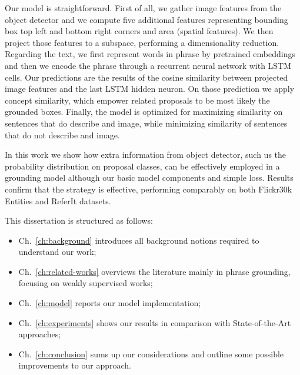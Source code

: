 Our model is straightforward. First of all, we gather image features
from the object detector and we compute five additional features
representing bounding box top left and bottom right corners and area
(spatial features). We then project those features to a subspace,
performing a dimensionality reduction. Regarding the text, we first
represent words in phrase by pretrained embeddings and then we encode
the phrase through a recurrent neural network with LSTM cells. Our
predictions are the results of the cosine similarity between projected
image features and the last LSTM hidden neuron. On those prediction we
apply concept similarity, which empower related proposals to be most
likely the grounded boxes. Finally, the model is optimized for
maximizing similarity on sentences that do describe and image, while
minimizing similarity of sentences that do not describe and image.

In this work we show how extra information from object detector, such
us the probability distribution on proposal classes, can be
effectively employed in a grounding model although our basic model
components and simple loss. Results confirm that the strategy is
effective, performing comparably on both Flickr30k Entities and
ReferIt datasets.

This dissertation is structured as follows:
\begin{itemize}
    \item Ch.~\ref{ch:background} introduces all background notions
    required to understand our work;
    \item Ch.~\ref{ch:related-works} overviews the literature mainly
    in phrase grounding, focusing on weakly supervised works;
    \item Ch.~\ref{ch:model} reports our model implementation;
    \item Ch.~\ref{ch:experiments} shows our results in comparison
    with State-of-the-Art approaches; 
    \item Ch.~\ref{ch:conclusion} sums up our considerations and
    outline some possible improvements to our approach.
\end{itemize}
